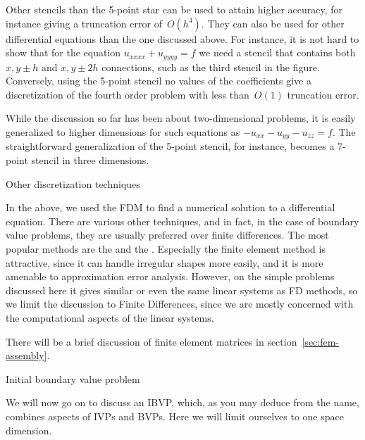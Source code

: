 Other stencils than the 5-point star can be used to attain higher
accuracy, for instance giving a truncation error of~$O(h^4)$. They can
also be used for other differential equations than the one discussed
above. For instance, it is not hard to show that for the equation
$u_{xxxx}+u_{yyyy}=f$ we need a stencil that contains both $x,y\pm h$
and $x,y\pm 2h$ connections, such as the third stencil in the
figure. Conversely, using the 5-point stencil no values of the
coefficients give a discretization of the fourth order problem with
less than~$O(1)$ truncation error.

While the discussion so far has been about two-dimensional
problems, it is easily generalized to higher dimensions for such
equations as $-u_{xx}-u_{yy}-u_{zz}=f$. The straightforward
generalization of the 5-point stencil, for instance, becomes a 7-point
stencil in three dimensions.

 {Other discretization techniques}
\label{sec:fem}

In the above, we used the \ac{FDM} to find a numerical solution
to a differential equation. There are various other techniques, and in
fact, in the case of boundary value problems, they are usually
preferred over finite differences. The most popular methods are the
 and the . Especially the finite element method is attractive, since
it can handle irregular shapes more easily, and it is more amenable to
approximation error analysis. However, on the simple problems discussed here
it gives similar or even the same linear systems as \ac{FD} methods,
so we limit the discussion to Finite Differences, since we are mostly
concerned with the computational aspects of the linear systems.

There will be a brief discussion of finite element matrices in
section~\ref{sec:fem-assembly}.


 {Initial boundary value problem}
\label{sec:heateq}

We will now go on to discuss an \acf{IBVP}, which, as you may deduce
from the name, combines aspects of \ac{IVP}s and \ac{BVP}s. Here we
will limit ourselves to one space dimension.

